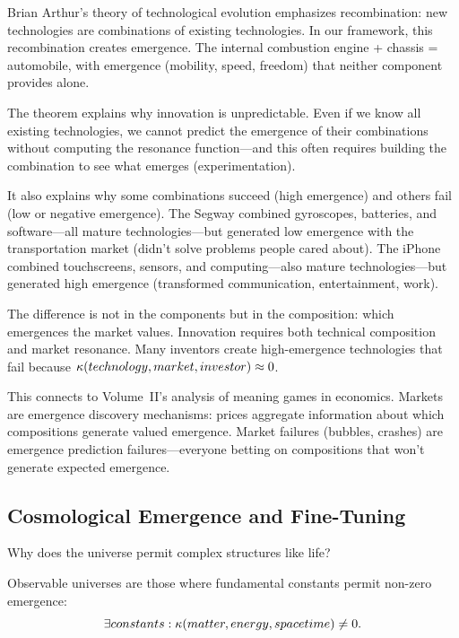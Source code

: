 \begin{interpretation}
Brian Arthur's theory of technological evolution emphasizes recombination:
new technologies are combinations of existing technologies. In our framework,
this recombination creates emergence. The internal combustion engine + chassis =
automobile, with emergence (mobility, speed, freedom) that neither component
provides alone.

The theorem explains why innovation is unpredictable. Even if we know all
existing technologies, we cannot predict the emergence of their combinations
without computing the resonance function---and this often requires building the
combination to see what emerges (experimentation).

It also explains why some combinations succeed (high emergence) and others fail
(low or negative emergence). The Segway combined gyroscopes, batteries, and
software---all mature technologies---but generated low emergence with the
transportation market (didn't solve problems people cared about). The iPhone
combined touchscreens, sensors, and computing---also mature technologies---but
generated high emergence (transformed communication, entertainment, work).

The difference is not in the components but in the composition: which emergences
the market values. Innovation requires both technical composition and market
resonance. Many inventors create high-emergence technologies that fail because
$\kappa(technology, market, investor) \approx 0$.

This connects to Volume~II's analysis of meaning games in economics. Markets
are emergence discovery mechanisms: prices aggregate information about which
compositions generate valued emergence. Market failures (bubbles, crashes) are
emergence prediction failures---everyone betting on compositions that won't
generate expected emergence.
\end{interpretation}

\subsection{Cosmological Emergence and Fine-Tuning}

Why does the universe permit complex structures like life?

\begin{theorem}
\label{thm:anthropic-emergence}
Observable universes are those where fundamental constants permit non-zero
emergence:
\[
  \exists constants: \kappa(matter, energy, spacetime) \neq 0.
\]
\end{theorem}

